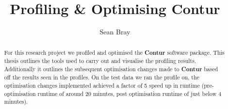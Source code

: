 \makeatletter
\renewcommand {\@degree@string} {Master of Science}
\makeatother

\title{Profiling \& Optimising Contur}
\author{Sean Bray}

\maketitle
\makedeclaration

\begin{abstract} %
For this research project we profiled and optimised the \textbf{Contur} software package. This thesis outlines the tools used to carry out and visualise the profiling results.
Additionally it outlines the subsequent optimisation changes made to \textbf{Contur} based off the results seen in the profiles. On the test data we ran the profile on, the optimisation changes
implemented achieved a factor of 5 speed up in runtime (pre-optimisation runtime of around 20 minutes, post optimisation runtime of just below 4 minutes).
\end{abstract}

\setcounter{tocdepth}{2} 

\tableofcontents
\listoffigures

